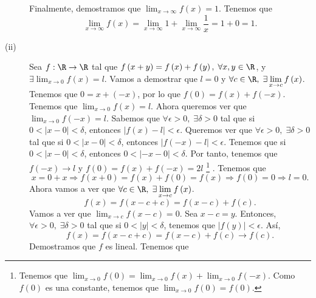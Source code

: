 \begin{eg}
\begin{description}
Finalmente, demostramos que $\displaystyle \lim_{x \to \infty}f\left(x\right) = 1 $. Tenemos que 
\[\lim_{x \to \infty}f\left(x\right) = \lim_{x \to \infty}1 + \lim_{x \to \infty}\frac{1}{x} = 1 + 0 = 1.\]
\item[(ii)] Sea $\displaystyle f : \R \to \R $ tal que $\displaystyle f\left(x+y\right) = f\left(x\right) + f\left(y\right), \; \forall x,y \in \R $, y $\displaystyle \exists\lim_{x \to 0}f\left(x\right)=l $. Vamos a demostrar que $\displaystyle l = 0 $ y $\displaystyle \forall c\in \R, \; \exists \lim_{x \to c}f\left(x\right) $. \\ 
Tenemos que $\displaystyle 0 = x + \left(-x\right) $, por lo que $\displaystyle f\left(0\right) = f\left(x\right)+f\left(-x\right) $. Tenemos que $\displaystyle \lim_{x \to 0}f\left(x\right) = l $. Ahora queremos ver que $\displaystyle \lim_{x \to 0}f\left(-x\right) = l $. Sabemos que $\displaystyle \forall\epsilon>0, \; \exists\delta>0 $ tal que si $\displaystyle 0 < \left|x-0\right| < \delta  $, entonces $\displaystyle \left|f\left(x\right)-l\right|<\epsilon  $. Queremos ver que $\displaystyle \forall\epsilon>0, \; \exists\delta>0 $ tal que si $\displaystyle 0 < \left|x-0\right| < \delta  $, entonces $\displaystyle \left|f\left(-x\right)-l\right|<\epsilon  $. Tenemos que si $\displaystyle 0 < \left|x-0\right|<\delta  $, entonces $\displaystyle 0 < \left|-x-0\right|<\delta  $. Por tanto, tenemos que $\displaystyle f\left(-x\right)\to l $ y $\displaystyle f\left(0\right) = f\left(x\right) + f\left(-x\right) = 2l $ \footnote{Tenemos que $\displaystyle \lim_{x \to 0}f\left(0\right) = \lim_{x \to 0}f\left(x\right) + \lim_{x \to 0}f\left(-x\right) $. Como $\displaystyle f\left(0\right) $ es una constante, tenemos que $\displaystyle \lim_{x \to 0}f\left(0\right)=f\left(0\right) $.} . Tenemos que
	\[x = 0 + x \Rightarrow f\left(x+0\right) = f\left(x\right) + f\left(0\right) = f\left(x\right) \Rightarrow f\left(0\right) = 0 \Rightarrow l=0 .\]
Ahora vamos a ver que $\displaystyle \forall c \in \R, \; \exists \lim_{x \to c}f\left(x\right) $.
\[f\left(x\right) = f\left(x-c+c\right)=f\left(x-c\right) + f\left(c\right) .\]
Vamos a ver que $\displaystyle \lim_{x \to c}f\left(x-c\right) = 0 $. Sea $\displaystyle x - c = y $. Entonces, $\displaystyle \forall \epsilon > 0, \; \exists \delta > 0 $ tal que si $\displaystyle 0< \left|y\right| < \delta  $, tenemos que $\displaystyle \left|f\left(y\right)\right| < \epsilon  $. Así, 
\[f\left(x\right) = f\left(x-c+c\right)=f\left(x-c\right) + f\left(c\right) \to f\left(c\right) .\]
Demostramos que $\displaystyle f $ es lineal. Tenemos que

\end{description}
\end{eg}
